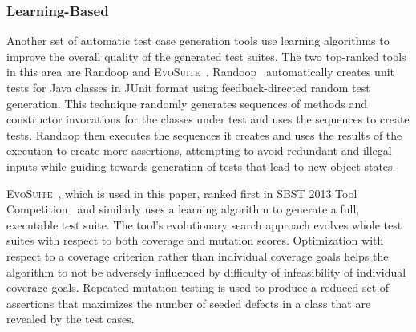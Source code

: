 \subsubsection{Learning-Based}

Another set of automatic test case generation tools use learning algorithms to improve the overall quality of the
generated test suites.  The two top-ranked tools in this area are Randoop and \textsc{EvoSuite}~\cite{fraser2013a}.
Randoop~\cite{pacheco2007feedback} automatically creates unit tests for Java classes in JUnit format using
feedback-directed random test generation. This technique randomly generates sequences of methods and constructor
invocations for the classes under test and uses the sequences to create tests. Randoop then executes the sequences it
creates and uses the results of the execution to create more assertions, attempting to  avoid redundant and illegal
inputs while guiding towards generation of tests that lead to new object states. 

\textsc{EvoSuite}~\cite{fraser:2011:eat:2025113.2025179}, which is used in this paper, ranked first in SBST 2013 Tool
Competition~\cite{fraser2013a} and similarly uses a learning algorithm to generate a full, executable test suite.  The
tool's evolutionary search approach evolves whole test suites with respect to both coverage and mutation scores.
Optimization with respect to a coverage criterion rather than individual coverage goals helps the algorithm to not be
adversely influenced by difficulty of infeasibility of individual coverage goals.  Repeated mutation testing is used to
produce a reduced set of assertions that maximizes the number of seeded defects in a class that are revealed by the test
cases.

